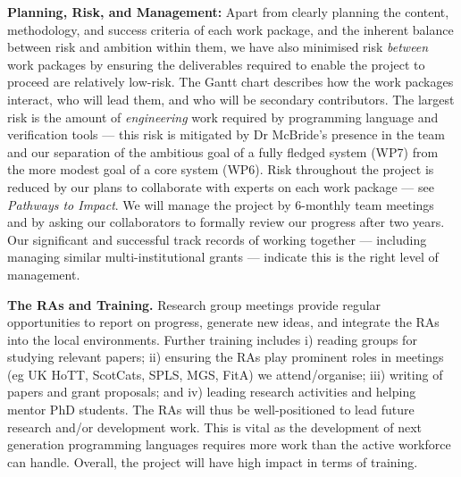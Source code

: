 \documentclass[a4paper,11pt]{article}
\begin{document}
{\bf Planning, Risk, and Management:} Apart from clearly
planning the content, methodology, and success criteria of each work package,
and the inherent balance between risk and ambition
within them, we have also minimised risk {\em between} work packages
by ensuring the deliverables required to enable the project to proceed 
are relatively low-risk. The Gantt chart describes how the work
packages interact, who will lead them, and who will be secondary
contributors. The largest risk is the 
amount of {\em engineering} work required by programming language
and verification tools --- this risk is mitigated by Dr McBride's
presence in the team and our 
separation of the ambitious
goal of a fully fledged system (WP7) from the more modest
goal of a core system (WP6). Risk throughout the project is reduced by
our plans to collaborate
with experts on each work package --- see {\em Pathways to Impact}. We
will manage the project by 6-monthly team meetings and by asking our
collaborators to formally review our progress after two years.  Our
significant and successful track records of working together ---
including managing similar multi-institutional grants --- indicate
this is the right level of management.


{\bf The RAs and Training.} Research group meetings provide regular opportunities to report on
progress, generate new ideas, and integrate the
RAs into the local environments. Further training includes i)
reading groups for studying relevant papers; ii) ensuring the RAs play
prominent roles in meetings (eg UK HoTT, ScotCats, SPLS, MGS, FitA) we
attend/organise; iii) writing of papers and grant proposals; and iv)
leading research activities and helping mentor PhD students.  The RAs
will thus be well-positioned to lead future research and/or
development work. This is vital as the development of next generation
programming languages requires more work than the active workforce can
handle. Overall, the project will have high impact in terms
of training.







\begin{footnotesize}
\begin{multicols}{2}

%
%

\end{multicols}
\end{footnotesize}

% 
% 
\end{document}

